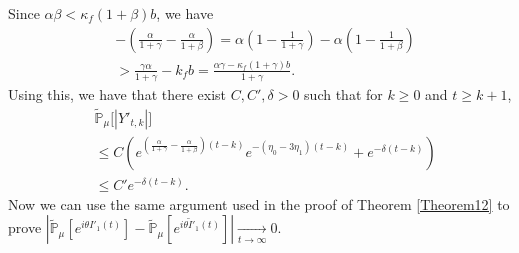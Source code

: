 \documentclass[12pt,a4paper]{amsart}
\theoremstyle{plain}
\theoremstyle{definition}
\numberwithin{equation}{section}
\begin{document}
Since $\alpha\beta<\kappa_f(1+\beta)b$,  we have
\begin{equation}\begin{split}
\label{eq: condition for supercritical}
	&-(\frac{\alpha}{1+\gamma}-\frac{\alpha}{1+\beta})
    = \alpha(1-\frac{1}{1+\gamma}) - \alpha(1-\frac{1}{1+\beta})
    \\&> \frac{\gamma \alpha}{1+\gamma} - k_f b
    =\frac{\alpha \gamma-\kappa_f(1+\gamma)b}{1+\gamma}.
\end{split}\end{equation}
	Using this, we have that there exist $C,C',
    \delta > 0$ such that for $k\geq 0$ and $t\geq k+1$,
\begin{align*}
    &\mathbb{\tilde{P}}_{\mu}\big[|Y'_{t,k}|\big]
    \\& \leq C( e^{(\frac{\alpha}{1+\gamma} - \frac{\alpha}{1+\beta})(t-k)}e^{-(\eta_0 - 3\eta_1)(t-k)}+ e^{-\delta(t-k)})
    \\& \leq C'e^{-\delta (t-k)}.
\end{align*}
Now we can  use the  same argument used in the proof of Theorem \ref{Theorem12}
to prove $|\mathbb{\tilde{P}}_{\mu}[e^{i\theta I'_1(t)}]-\mathbb{\tilde{P}}_{\mu}[e^{i\theta\tilde I'_1(t)}]|\xrightarrow[t\to \infty]{} 0$.
\end{document}
